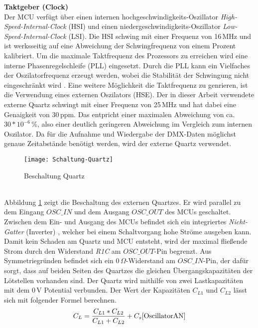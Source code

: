 \newline
\textbf{Taktgeber (Clock)}\\
Der MCU verfügt über einen internen hochgeschwindigkeits-Oszillator \textit{High-Speed-Internal-Clock} (HSI) und einen niedergeschwindigkeits-Oszillator \textit{Low-Speed-Internal-Clock} (LSI). Die HSI schwing mit einer Frequenz von 16\,MHz und ist werksseitig auf eine Abweichung der Schwingfrequenz von einem Prozent kalibriert. Um die maximale Taktfrequenz des Prozessors zu erreichen wird eine interne Phasenregelschleife (PLL) eingesetzt. Durch die PLL kann ein Vielfaches der Oszilatorfrequenz erzeugt werden, wobei die Stabilität der Schwingung nicht eingeschränkt wird \cite[S. 270]{Ehrhardt1992}. Eine weitere Möglichkeit die Taktfrequenz zu genrieren, ist die Verwendung eines externen Oszilators (HSE). Der in dieser Arbeit verwendete externe Quartz schwingt mit einer Frequenz von 25\,MHz und hat dabei eine Genaigkeit von 30\,ppm. Das entpricht einer maximalen Abweichung von ca. \(30*10^{-6}\)\,\%, also einer deutlich geringeren Abweichung im Vergleich zum internen Oszilator. Da für die Aufnahme und Wiedergabe der DMX-Daten möglichst genaue Zeitabstände benötigt werden, wird der externe Quartz verwendet.
\begin{figure}[!h]
	\begin{center}
			\texttt{[image: Schaltung-Quartz]}
			\caption{Beschaltung Quartz}
			\label{fig:Quartz}
	\end{center}
\end{figure}\\
Abbildung \ref{fig:Quartz} zeigt die Beschaltung des externen Quartzes. Er wird parallel zu dem Eingang $OSC\_IN$ und dem Ausgang $OSC\_OUT$ des MCUs geschaltet. Zwischen dem Ein- und Ausgang des MCUs befindet sich ein integriertes \textit{Nicht-Gatter} (Inverter) \cite[S. 11]{OscillatorAN}, welcher bei einem Schaltvorgang hohe Ströme ausgeben kann. Damit kein Schaden am Quartz und MCU entsteht, wird der maximal fließende Strom durch den Widerstand \textit{R1C} am $OSC\_OUT$-Pin begrenzt. Aus Symmetriegründen befindet sich ein 0\,$\Omega$-Widerstand am $OSC\_IN$-Pin, der dafür sorgt, dass auf beiden Seiten des Quartzes die gleichen Übergangskapazitäten der Lötstellen vorhanden sind. Der Quartz wird mithilfe von zwei Lastkapazitäten mit dem 0\,V Potential verbunden. Der Wert der Kapazitäten \textit{$C_{L1}$} und \textit{$C_{L2}$} lässt sich mit folgender Formel berechnen.
\begin{equation}
		C_L = \frac{C_{L1} * C_{L2}} {C_{L1} + C_{L2}} + C_s \cite[S. 12]{OscillatorAN}
\end{equation}
